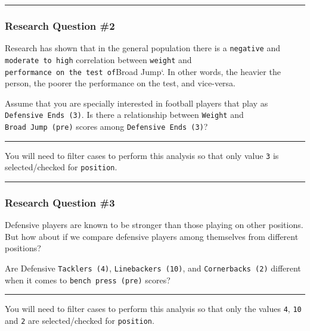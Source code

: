 \documentclass[
]{article}
\begin{document}
\begin{center}\rule{0.5\linewidth}{0.5pt}\end{center}

\hypertarget{research-question-2}{%
\subsubsection{Research Question \#2}\label{research-question-2}}

Research has shown that in the general population there is a \texttt{negative} and \texttt{moderate\ to\ high} correlation between \texttt{weight} and \texttt{performance\ on\ the\ test\ of}Broad Jump`. In other words, the heavier the person, the poorer the performance on the test, and vice-versa.

Assume that you are specially interested in football players that play as \texttt{Defensive\ Ends\ (3)}. Is there a relationship between \texttt{Weight} and \texttt{Broad\ Jump\ (pre)} scores among \texttt{Defensive\ Ends\ (3)}?

\begin{center}\rule{0.5\linewidth}{0.5pt}\end{center}

You will need to filter cases to perform this analysis so that only value \texttt{3} is selected/checked for \texttt{position}.

\begin{center}\rule{0.5\linewidth}{0.5pt}\end{center}

\hypertarget{research-question-3}{%
\subsubsection{Research Question \#3}\label{research-question-3}}

Defensive players are known to be stronger than those playing on other positions. But how about if we compare defensive players among themselves from different positions?

Are Defensive \texttt{Tacklers\ (4)}, \texttt{Linebackers\ (10)}, and \texttt{Cornerbacks\ (2)} different when it comes to \texttt{bench\ press\ (pre)} scores?

\begin{center}\rule{0.5\linewidth}{0.5pt}\end{center}

You will need to filter cases to perform this analysis so that only the values \texttt{4}, \texttt{10} and \texttt{2} are selected/checked for \texttt{position}.
\end{document}
